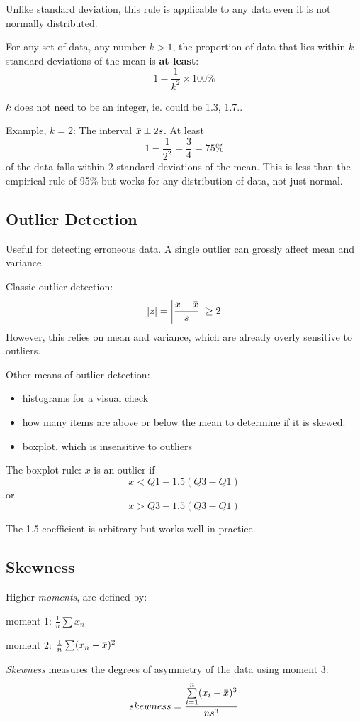 \documentclass[11pt, oneside]{article}   	%
\newcommand{\overbar}[1]{\mkern 1.5mu\overline{\mkern-1.5mu#1\mkern-1.5mu}\mkern 1.5mu}
\begin{document}
Unlike standard deviation, this rule is applicable to any data even it is not normally distributed.

For any set of data, any number $k > 1$, the proportion of data that lies within $k$ standard deviations of the mean is \textbf{at least}:
\[
1 - \frac{1} {k^2} \times 100\%
\]

$k$ does not need to be an integer, ie. could be 1.3, 1.7..

Example, $k=2$:
The interval $\overbar{x} \pm 2s$. At least
\[
1 - \frac{1} {2^2} = \frac{3}{4} = 75\%
\]
of the data falls within 2 standard deviations of the mean. This is less than the empirical rule of 95\% but works for any distribution of data, not just normal.

\subsection{Outlier Detection}

Useful for detecting erroneous data. A single outlier can grossly affect mean and variance.

Classic outlier detection:
\[
|z| = \bigg\lvert \frac{x - \overbar{x}} {s} \bigg\lvert \geq 2
\]
However, this relies on mean and variance, which are already overly sensitive to outliers.

Other means of outlier detection:
\begin{itemize}
\item{histograms for a visual check}
\item{how many items are above or below the mean to determine if it is skewed.}
\item{boxplot, which is insensitive to outliers}
\end{itemize}

The boxplot rule: $x$ is an outlier if 
\[
x < Q1 - 1.5 (Q3-Q1)
\]
or
\[
x > Q3 - 1.5 (Q3-Q1)
\]

The 1.5 coefficient is arbitrary but works well in practice.


\subsection{Skewness}

Higher \textit{moments}, are defined by:

moment 1: $\frac{1}{n} \sum x_n$

moment 2: $\frac{1}{n} \sum (x_n - \overbar{x})^2$

\textit{Skewness} measures the degrees of asymmetry of the data using moment 3:
\[
skewness = \frac{\sum\limits_{i=1}^n (x_i - \overbar{x})^3 } { n s^3}
\]
\end{document}
